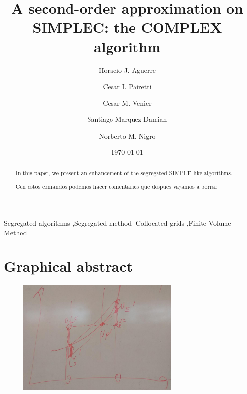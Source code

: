 \documentclass[final,3p,times,10pt,onecolumn]{myElsarticle}
\date{\today}
\numberwithin{equation}{section}
\newcommand{\CIP}[1]{{\color{blue} #1}}
\begin{document}
\begin{frontmatter}

\title{A second-order approximation on SIMPLEC: the COMPLEX algorithm}
 
\author[a,e]{Horacio J. Aguerre}
\author[b,a]{Cesar I. Pairetti}
\author[a,b]{Cesar M. Venier}
\author[a,c]{Santiago Marquez Damian}
\author[a,d]{Norberto M. Nigro}

\address[a]{Centro de Investigación de Métodos Computacionales, CONICET-UNL, Santa Fe, Argentina}
\address[b]{Escuela de Ingenier\'ia Mec\'anica, Facultad de Ciencias Exactas, Ingenieria y Agrimensura, Universidad Nacional de Rosario, Rosario, Argentina}
\address[c]{Facultad Regional Santa Fe, Universidad Tecnologica Nacional, Santa Fe, Argentina}
\address[d]{Facultad de Ingeniería y Ciencias Hídricas, Universidad Nacional del Litoral, Santa Fe, Argentina}
\address[e]{Facultad Regional Concepción de Uruguay, Universidad Tecnologica Nacional, Concepción del Uruguay, Argentina}

\begin{abstract}
In this paper, we present an enhancement of the segregated SIMPLE-like algorithms.

\CIP{Con estos comandos podemos hacer comentarios que después vayamos a borrar}

\end{abstract}

\begin{keyword}
Segregated algorithms \sep Segregated method \sep Collocated grids \sep Finite Volume Method 
\end{keyword}
\end{frontmatter}

\section*{Graphical abstract}
\begin{figure}[h]
\centering
\includegraphics[width=8cm]{graph_abstract.jpg}
\end{figure}
\end{document}
